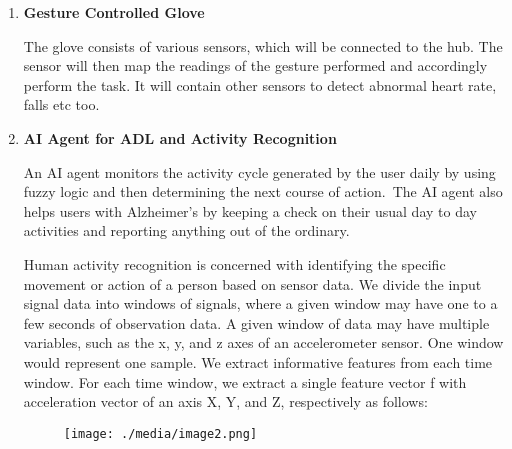 \documentclass[12pt]{article}
\begin{document}
\begin{enumerate}
	\item \textbf{Gesture Controlled Glove}\par

\begin{justify}
The glove consists of various sensors, which will be connected to the hub. The sensor will then map the readings of the gesture performed and accordingly perform the task. It will contain other sensors to detect abnormal heart rate, falls etc too.
\end{justify}\par

	\item \textbf{AI Agent for ADL and Activity Recognition }\par

\begin{justify}
An AI agent monitors the activity cycle generated by the user daily by using fuzzy logic and then determining the next course of action. The AI agent also helps users with Alzheimer's by keeping a check on their usual day to day activities and reporting anything out of the ordinary.
\end{justify}\par

\begin{justify}
Human activity recognition is concerned with identifying the specific movement or action of a person based on sensor data. We divide the input signal data into windows of signals, where a given window may have one to a few seconds of observation data. A given window of data may have multiple variables, such as the x, y, and z axes of an accelerometer sensor. One window would represent one sample. We extract informative features from each time window. For each time window, we extract a single feature vector f with acceleration vector of an axis X, Y, and Z, respectively as follows: 
\end{justify}\par




\begin{figure}[H]
	\begin{Center}
		\texttt{[image: ./media/image2.png]}
	\end{Center}
\end{figure}



\end{enumerate}
\end{document}
